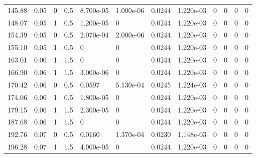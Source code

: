 \documentclass[preview]{standalone}
\begin{document}
{{\begin{tabular}{L{1.2cm}C{1.2cm} C{0.3cm}C{0.5cm} C{1.4cm}C{1.4cm} C{1.4cm}C{1.4cm} C{1.6cm}C{1.6cm} C{1.6cm}C{1.6cm}}
  145.88  &  0.05  & 0     & 0.5 &  8.700e-05  & 1.000e-06  &  0.0244&   1.220e-03& 0 & 0   &  0 & 0  \\ 
  148.07  &  0.05  & 1     & 0.5 &  1.200e-05  & 0  &  0.0244&   1.220e-03& 0 & 0   &  0 & 0  \\ 
  154.39  &  0.05  & 0     & 0.5 &  2.070e-04  & 2.000e-06  &  0.0244&   1.220e-03& 0 & 0   &  0 & 0  \\ 
  155.10  &  0.05  & 1     & 0.5 &  0  & 0  &  0.0244&   1.220e-03& 0 & 0   &  0 & 0  \\ 
  163.01  &  0.06  & 1     & 1.5 &  0  & 0  &  0.0244&   1.220e-03& 0 & 0   &  0 & 0  \\ 
  166.90  &  0.06  & 1     & 1.5 &  3.000e-06  & 0  &  0.0244&   1.220e-03& 0 & 0   &  0 & 0  \\ 
  170.42  &  0.06  & 0     & 0.5 &  0.0597  & 5.130e-04  &  0.0245&   1.224e-03& 0 & 0   &  0 & 0  \\ 
  174.06  &  0.06  & 1     & 0.5 &  1.800e-05  & 0  &  0.0244&   1.220e-03& 0 & 0   &  0 & 0  \\ 
  179.15  &  0.06  & 1     & 1.5 &  2.300e-05  & 0  &  0.0244&   1.220e-03& 0 & 0   &  0 & 0  \\ 
  187.68  &  0.06  & 1     & 1.5 &  0  & 0  &  0.0244&   1.220e-03& 0 & 0   &  0 & 0  \\ 
  192.76  &  0.07  & 0     & 0.5 &  0.0160  & 1.370e-04  &  0.0230&   1.148e-03& 0 & 0   &  0 & 0  \\ 
  196.28  &  0.07  & 1     & 1.5 &  4.900e-05  & 0  &  0.0244&   1.220e-03& 0 & 0   &  0 & 0  \\ 
\hline 
\end{tabular} 

}}
\end{document}
